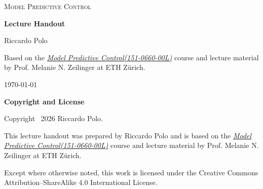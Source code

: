 \documentclass[11pt,a4paper]{book}
\begin{document}
\begin{titlepage}
    \centering
    {\scshape\LARGE Model Predictive Control\par}
    \vspace{0.6cm}
    {\huge\bfseries Lecture Handout\par}

    \vfill

    {\large Riccardo Polo\par}

    \vspace{0.5cm}

    {\small
    Based on the \href{https://www.vvz.ethz.ch/Vorlesungsverzeichnis/lerneinheit.view?lerneinheitId=198407&semkez=2026S&lang=en&ansicht=LEISTUNGSKONTROLLE}{\emph{Model Predictive Control(151-0660-00L)}} course and lecture material
    by Prof. Melanie N. Zeilinger at ETH Zürich.\par}

    \vspace{0.8cm}

    {\large \today\par}
\end{titlepage}

\clearpage
\thispagestyle{empty}

\vspace*{\fill}

\begin{center}
    {\large\bfseries Copyright and License\par}

    \vspace{1cm}

    Copyright \textcopyright\ 2026 Riccardo Polo.

    \vspace{0.8cm}

    This lecture handout was prepared by Riccardo Polo and is based on
    the \href{https://www.vvz.ethz.ch/Vorlesungsverzeichnis/lerneinheit.view?lerneinheitId=198407&semkez=2026S&lang=en&ansicht=LEISTUNGSKONTROLLE}{\emph{Model Predictive Control(151-0660-00L)}} course and lecture material by
    Prof. Melanie N. Zeilinger at ETH Zürich.

    \vspace{1cm}

    \doclicenseThis
\end{center}

\vspace{0.8cm}

\noindent\small
Except where otherwise noted, this work is licensed under the
Creative Commons Attribution--ShareAlike 4.0 International License.
\end{document}
